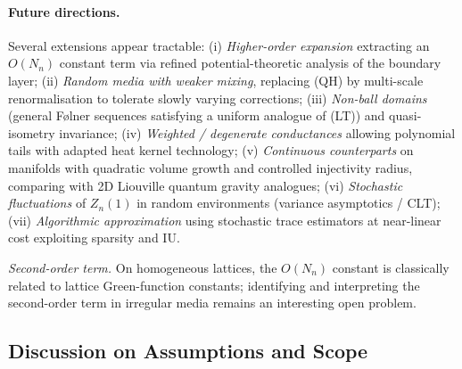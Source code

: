 \documentclass[reqno]{amsart}
\numberwithin{equation}{section}
\theoremstyle{definition}
\theoremstyle{remark}
\begin{document}
\paragraph{Future directions.} Several extensions appear tractable: (i) \emph{Higher-order expansion} extracting an $O(N_n)$ constant term via refined potential-theoretic analysis of the boundary layer; (ii) \emph{Random media with weaker mixing}, replacing (QH) by multi-scale renormalisation to tolerate slowly varying corrections; (iii) \emph{Non-ball domains} (general Følner sequences satisfying a uniform analogue of (LT)) and quasi-isometry invariance; (iv) \emph{Weighted / degenerate conductances} allowing polynomial tails with adapted heat kernel technology; (v) \emph{Continuous counterparts} on manifolds with quadratic volume growth and controlled injectivity radius, comparing with 2D Liouville quantum gravity analogues; (vi) \emph{Stochastic fluctuations} of $Z_n(1)$ in random environments (variance asymptotics / CLT); (vii) \emph{Algorithmic approximation} using stochastic trace estimators at near-linear cost exploiting sparsity and IU.

\smallskip
\noindent\emph{Second-order term.} On homogeneous lattices, the $O(N_n)$ constant is classically related to lattice Green-function constants; identifying and interpreting the second-order term in irregular media remains an interesting open problem.

\subsection{Discussion on Assumptions and Scope}
\end{document}
